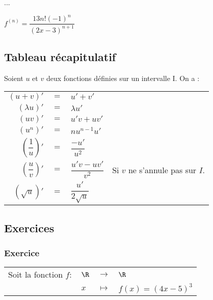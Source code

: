 ... \vspace*{.3cm} 

$f^{(n)} = \dfrac{13n!\left(-1\right)^{n}}{\left(2x-3\right)^{n+1}}$

\newpage

\subsection{Tableau récapitulatif}

Soient $u$ et $v$ deux fonctions définies sur un intervalle I. On a : \\

\begin{tabular}{rlll}
$\left(u + v\right)'$ & $=$ & $u' + v' $ & \vspace*{.3cm} \\
$\left(\lambda u\right)'$ & $=$ & $\lambda u'$ & \vspace*{.3cm} \\
$\left(uv\right)'$ & $=$ & $u'v + uv'$ & \vspace*{.3cm} \\
$\left(u^n\right)'$ & $ = $ & $ nu^{n-1}u'$ & \vspace*{.3cm} \\
$\left(\dfrac{1}{u}\right)'$ & $=$ & $\dfrac{-u'}{u^2}$ & \vspace*{.3cm} \\
$\left(\dfrac{u}{v}\right)'$ & $=$ & $\dfrac{u'v - uv'}{v^2}$ & Si $v$ ne s'annule pas sur $I$. \vspace*{.3cm} \\
$\left(\sqrt{u}\right)'$ & $=$ & $\dfrac{u'}{2\sqrt{u}}$ & \vspace*{.3cm} \\
\end{tabular}

\newpage

\subsection{Exercices}

\subsubsection{Exercice }

\begin{tabular}{llll}
Soit la fonction $f :$ & $\R$ & $\longrightarrow$ & $\R$ \\
& $x$ & $\longmapsto$ & $f(x) = \left(4x - 5\right)^3$ \\
\end{tabular}

